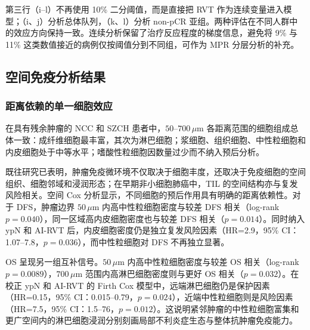 第三行（i--l）不再使用 10\% 二分阈值，而是直接把 RVT 作为连续变量进入模型；（i、j）分析总体队列，（k、l）分析 non-pCR 亚组。两种评估在不同人群中的效应方向保持一致。连续分析保留了治疗反应程度的梯度信息，避免将 9\% 与 11\% 这类数值接近的病例仅按阈值分到不同组，可作为 MPR 分层分析的补充。

\subsection{空间免疫分析结果}
\subsubsection{距离依赖的单一细胞效应}
在具有残余肿瘤的 NCC 和 SZCH 患者中，$50$--$700\,\mu\mathrm{m}$ 各距离范围的细胞组成总体一致：成纤维细胞最丰富，其次为淋巴细胞；浆细胞、组织细胞、中性粒细胞和内皮细胞处于中等水平；嗜酸性粒细胞因数量过少而不纳入预后分析。

既往研究已表明，肿瘤免疫微环境不仅取决于细胞丰度，还取决于免疫细胞的空间组织、细胞邻域和浸润形态\cite{keren2018structured,saltz2018spatial}；在早期非小细胞肺癌中，TIL 的空间结构亦与复发风险相关\cite{corredor2019spatil}。空间 Cox 分析显示，不同细胞的预后作用具有明确的距离依赖性。对于 DFS，肿瘤边界 $50\,\mu\mathrm{m}$ 内高中性粒细胞密度与较差 DFS 相关（log-rank $p=0.040$），同一区域高内皮细胞密度也与较差 DFS 相关（$p=0.014$）。同时纳入 ypN 和 AI-RVT 后，内皮细胞密度仍是独立复发风险因素（HR=2.9，95\% CI：1.07--7.8，$p=0.036$），而中性粒细胞对 DFS 不再独立显著。

OS 呈现另一组互补信号。$50\,\mu\mathrm{m}$ 内高中性粒细胞密度与较差 OS 相关（log-rank $p=0.0089$），$700\,\mu\mathrm{m}$ 范围内高淋巴细胞密度则与更好 OS 相关（$p=0.032$）。在校正 ypN 和 AI-RVT 的 Firth Cox 模型中，远端淋巴细胞仍是保护因素（HR=0.15，95\% CI：0.015--0.79，$p=0.024$），近端中性粒细胞则是风险因素（HR=7.5，95\% CI：1.5--76，$p=0.012$）。这说明紧邻肿瘤的中性粒细胞富集和更广空间内的淋巴细胞浸润分别刻画局部不利炎症生态与整体抗肿瘤免疫能力。

\begin{table}[htbp]
  \centering
  \caption{空间免疫特征的预后效应}
  \label{tab:lung_spatial_effects}
\end{table}

